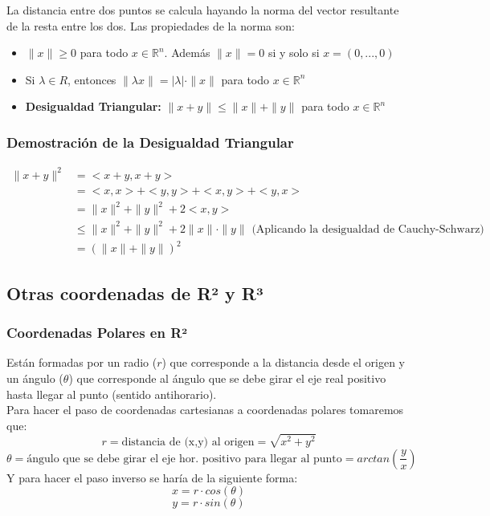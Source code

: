 \documentclass[11pt]{article}
\newcommand{\R}{\mathbb{R}}
\theoremstyle{plain}
\begin{document}
            La distancia entre dos puntos se calcula hayando la norma del vector resultante de la resta entre los dos. Las propiedades de la norma son:
            \begin{itemize}
                \item $\|x\| \ge 0$ para todo $x \in \R^n$. Además $\|x\|=0$ si y solo si $x = (0,...,0)$
                \item Si $\lambda \in R$, entonces $\|\lambda x\| = |\lambda|\cdot\|x\|$ para todo $x \in \R^n$
                \item \textbf{Desigualdad Triangular:} $\|x+y\| \le \|x\| + \|y\|$ para todo $x \in \R^n$
            \end{itemize}
            \subsubsection{Demostración de la Desigualdad Triangular} %
            \label{subsub:demostración_de_la_desigualdad_triangular}
                \begin{equation}
                    \begin{aligned}
                        \|x+y\|^2 & = <x+y,x+y> \\ 
                        & = <x,x> + <y,y> + <x,y> + <y,x> \\
                        & = \|x\|^2 + \|y\| ^2 + 2 <x,y> \\
                        & \le \|x\|^2 + \|y\|^2 + 2\|x\|\cdot \|y\| \text{ (Aplicando la desigualdad de Cauchy-Schwarz)}\\
                        & = (\|x\| + \|y\|)^2
                    \end{aligned}
                \end{equation}
        \subsection{Otras coordenadas de R² y R³ } %
        \label{sub:otras_coordenadas_de_r_y_}
            \subsubsection{Coordenadas Polares en R²} %
            \label{subsub:coordenadas_polares_en_r2}
                Están formadas por un radio ($r$) que corresponde a la distancia desde el origen y un ángulo ($\theta$) que corresponde al ángulo que se debe girar el eje real positivo hasta llegar al punto (sentido antihorario). \\ Para hacer el paso de coordenadas cartesianas a coordenadas polares tomaremos que: \[r = \text{distancia de (x,y) al origen} = \sqrt{x^2 + y^2}\]\[\theta = \text{ángulo que se debe girar el eje hor. positivo para llegar al punto} = arctan(\frac{y}{x})\]
                Y para hacer el paso inverso se haría de la siguiente forma:\[x = r\cdot cos(\theta)\]\[y = r\cdot sin(\theta)\]
                    
\end{document}
